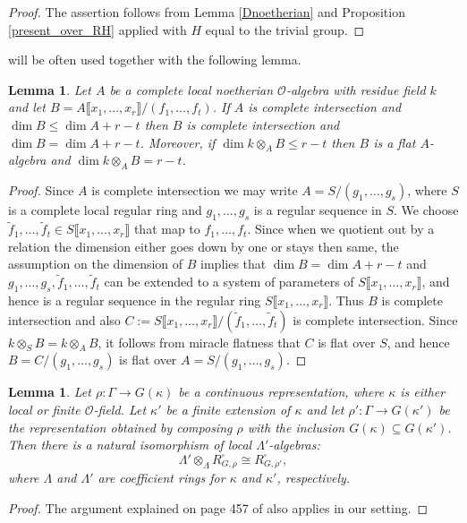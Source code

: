\documentclass{amsart}
\newtheorem{lem}[prop]{Lemma}
\theoremstyle{definition}
\theoremstyle{remark}
\newcommand{\OO}{\mathcal O}
\newcommand{\br}[1]{\llbracket #1\rrbracket}
\begin{document}
\begin{proof} The assertion follows from Lemma \ref{Dnoetherian} and Proposition
\ref{present_over_RH} applied with  $H$ equal to the trivial group. 
 \end{proof}

 
 will be often used together with the following lemma.

\begin{lem}\label{pre_lci_flat} Let $A$ be a complete local noetherian $\OO$-algebra with residue field $k$ and let 
$B= A\br{x_1, \ldots, x_r}/(f_1, \ldots, f_t)$. If $A$ is complete intersection and 
$\dim B\le \dim A + r - t$ then $B$ is complete intersection and $\dim B=\dim A + r - t$. Moreover, if $\dim k\otimes_A B\le  r-t$ then $B$ is a  flat $A$-algebra and $\dim k\otimes_A B=  r-t$.
\end{lem} 

\begin{proof} Since $A$ is complete intersection we may write $A= S/(g_1, \ldots, g_s)$, 
where $S$ is a complete local regular ring and $g_1, \ldots, g_s$ is a regular sequence in $S$.
We choose $\tilde{f}_1, \ldots, \tilde{f}_t \in S\br{x_1, \ldots, x_r}$ that map to 
$f_1, \ldots, f_t$. Since when we quotient out by a relation the dimension either goes down 
by one or stays then same, 
the assumption on the dimension of $B$ implies that $\dim B= \dim A + r - t$ and $g_1, \ldots, g_s, \tilde{f}_1, \ldots, \tilde{f}_t$ 
can be extended to a system of parameters of $S\br{x_1,\ldots, x_r}$, and hence is a regular sequence in 
the regular ring $S\br{x_1,\ldots, x_r}$. Thus $B$ is complete intersection and also $C:= S\br{x_1, \ldots, x_r}/(\tilde{f}_1, \ldots, \tilde{f}_t)$ is complete intersection.  
Since $k\otimes_S B= k\otimes_A B$, it follows from miracle flatness \cite[Theorem 23.1]{matsumura} that $C$ is flat over $S$, 
and hence $B= C/(g_1, \ldots, g_s)$ is flat over $A= S/(g_1, \ldots, g_s)$. 
\end{proof}



\begin{lem}\label{extend_scalars1} Let $\rho: \Gamma \rightarrow G(\kappa)$ be a continuous representation, where
$\kappa$ is either local or finite $\OO$-field. Let $\kappa'$ be a finite extension of $\kappa$ 
and let $\rho': \Gamma \rightarrow G(\kappa')$ be the representation obtained by 
composing $\rho$ with the inclusion $G(\kappa) \subseteq G(\kappa')$. Then there is a natural 
isomorphism of local $\Lambda'$-algebras: 
$$ \Lambda'\otimes_{\Lambda} R^{\square}_{G, \rho} \cong R^{\square}_{G, \rho'},$$
where $\Lambda$ and $\Lambda'$ are coefficient rings for $\kappa$ and $\kappa'$, respectively.
\end{lem}
\begin{proof} The argument explained on page 457 of \cite{Wiles} also applies in our setting. 
\end{proof}
\end{document}
